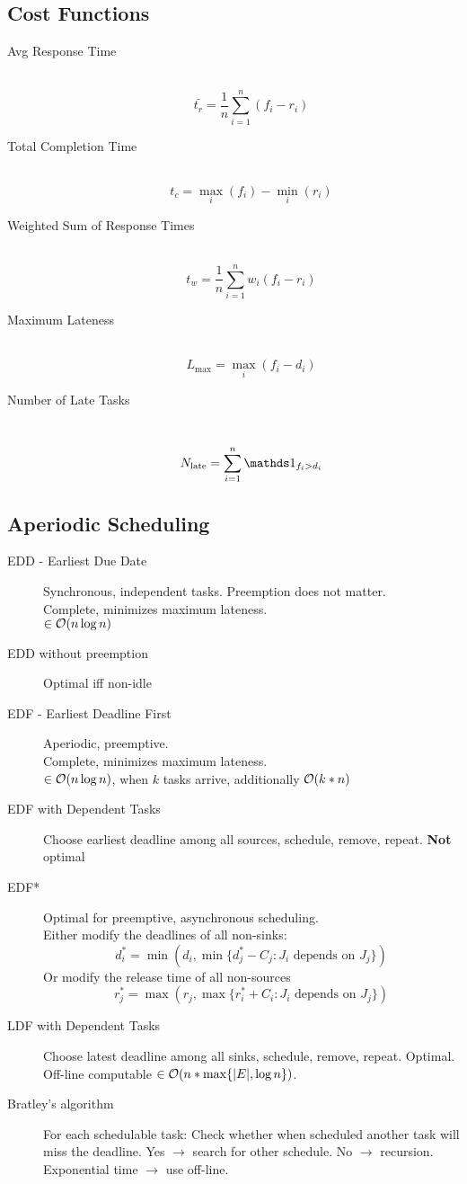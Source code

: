 \subsection*{Cost Functions}
\begin{description}
	\item[Avg Response Time] \ 
	\[ \bar{t_r} = \frac{1}{n}\sum_{i=1}^n(f_i-r_i) \]
	\item[Total Completion Time] \ 
	\[ t_c = \max_i(f_i) - \min_i(r_i) \]
	\item[Weighted Sum of Response Times]\ 
	\[ t_w = \frac{1}{n}\sum_{i=1}^nw_i(f_i-r_i) \]
	\item[Maximum Lateness] \ 
	\[ L_{\max} = \max_i(f_i - d_i) \]
	\item[Number of Late Tasks] \ 
	\[ N_{\text{late}} = \sum_{i=1}^n \INDICATOR{f_i > d_i} \]
\end{description}

\subsection*{Aperiodic Scheduling}
\begin{description}
	\item[EDD - Earliest Due Date] Synchronous, independent tasks. Preemption
	does not matter. \\ Complete, minimizes maximum lateness.\\ $\in \operatorname{\mathcal{O}}(n
	\log n)$
	\item[EDD without preemption] Optimal iff non-idle
	\item[EDF - Earliest Deadline First] Aperiodic, preemptive.\\ Complete,
	minimizes maximum lateness.\\ $\in \operatorname{\mathcal{O}}(n \log n)$, when $k$ tasks arrive,
	additionally $\operatorname{\mathcal{O}}(k*n)$
	\item[EDF with Dependent Tasks] Choose earliest deadline among all sources,
	schedule, remove, repeat. \textbf{Not} optimal
	\item[EDF*] Optimal for preemptive, asynchronous scheduling.\\
	Either modify the deadlines of all non-sinks:
	\[ d_i^* = \min(d_i, \min\{d_j^* - C_j : J_i \text{ depends on } J_j\}) \]
	Or modify the release time of all non-sources
	\[ r_j^* = \max(r_j, \max\{r_i^* + C_i : J_i \text{ depends on } J_j\}) \]
	\item[LDF with Dependent Tasks] Choose latest deadline among all sinks,
	schedule, remove, repeat. Optimal. Off-line computable $\in \operatorname{\mathcal{O}}(n * \max
	\{|E|, \log n\})$.
	\item[Bratley's algorithm] For each schedulable task: Check whether when
	scheduled another task will miss the deadline. Yes $\rightarrow$ search for
	other schedule. No $\rightarrow$ recursion. \\ 
	Exponential time $\rightarrow$ use off-line.
\end{description}

